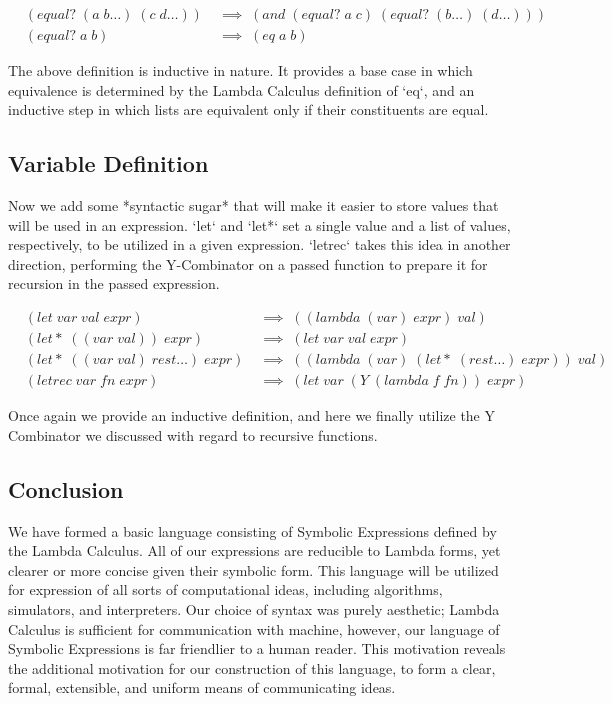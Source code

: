 \documentclass[11pt]{article}
\begin{document}
\begin{align*}
& (equal? \; (a \; b\dots) \; (c \; d\dots)) \; &\implies \; (and \; (equal? \; a \; c) \; (equal? \; (b\dots) \; (d\dots)))
\\& (equal? \; a \; b) \; &\implies \; (eq \; a \; b)
\end{align*}

The above definition is inductive in nature. It provides a base case in which equivalence is determined by the Lambda Calculus definition of `eq`, and an inductive step in which lists are equivalent only if their constituents are equal.

\subsection{Variable Definition}
Now we add some *syntactic sugar* that will make it easier to store values that will be used in an expression. `let` and `let*` set a single value and a list of values, respectively, to be utilized in a given expression. `letrec` takes this idea in another direction, performing the Y-Combinator on a passed function to prepare it for recursion in the passed expression.

\begin{align*}
& (let \; var \; val \; expr) \; &\implies \; ((lambda \; (var) \; expr) \; val)
\\& (let* \; ((var \; val)) \; expr) \; &\implies \; (let \; var \; val \; expr)
\\& (let* \; ((var \; val) \; rest\dots) \; expr) \; &\implies \; ((lambda \; (var) \; (let* \; (rest\dots) \; expr)) \; val)
\\& (letrec \; var \; fn \; expr) \; &\implies \; (let \; var \; (Y \; (lambda \; f \; fn)) \; expr)
\end{align*}

Once again we provide an inductive definition, and here we finally utilize the Y Combinator we discussed with regard to recursive functions.

\subsection{Conclusion}
We have formed a basic language consisting of Symbolic Expressions defined by the Lambda Calculus. All of our expressions are reducible to Lambda forms, yet clearer or more concise given their symbolic form. This language will be utilized for expression of all sorts of computational ideas, including algorithms, simulators, and interpreters. Our choice of syntax was purely aesthetic; Lambda Calculus is sufficient for communication with machine, however, our language of Symbolic Expressions is far friendlier to a human reader. This motivation reveals the additional motivation for our construction of this language, to form a clear, formal, extensible, and uniform means of communicating ideas.
\end{document}
